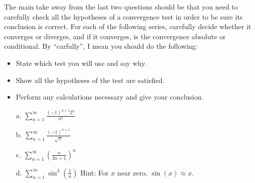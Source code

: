 \documentclass[letterpaper,11pt]{examPTP}
\begin{document}
\begin{questions}

\question[20] The main take away from the last two questions should be that you need to carefully check all the hypotheses of a convergence test in order to be sure its conclusion is correct. For each of the following series, carefully decide whether it converges or diverges, and if it converges, is the convergence absolute or conditional. By ``carfully'', I mean you should do the following:
\begin{itemize}
\item State which test you will use and say why.
\item Show all the hypotheses of the test are satisfied.
\item Perform any calculations necessary and give your conclusion. 
\end{itemize}
\pagebreak
\begin{enumerate}
\item[a.] $\sum\limits_{n=1}^{\infty} \frac{(-1)^{n+1}2^n}{n!}$
\item[b.] $\sum\limits_{n=1}^{\infty} \frac{(-1)^{n+1}}{\sqrt{n}}$
\item[c.] $\sum\limits_{n=1}^{\infty} \left(\frac{n}{3n+1}\right)^n$
\item[d.] $\sum\limits_{n=1}^{\infty} \sin^{3}\left(\frac{1}{n}\right)$ Hint: For $x$ near zero, $\sin(x)\approx x$.
\end{enumerate}


\end{questions}      

\vspace{0.5in}
\end{document}
